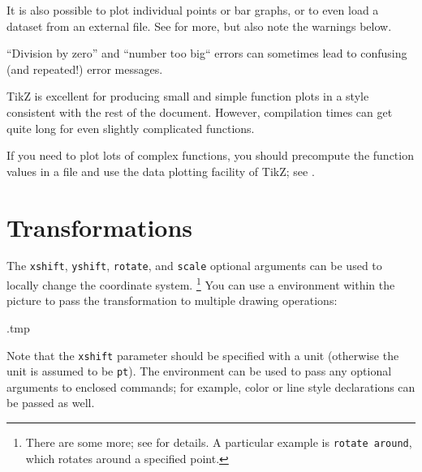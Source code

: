 It is also possible to plot individual points or bar graphs,
or to even load a dataset from an external file.
See \cite[Section~22]{tikz} for more,
but also note the warnings below.

\begin{warning}
``Division by zero'' and ``number too big`` errors
can sometimes lead to confusing (and repeated!) error messages.
\end{warning}

\begin{practices}
TikZ is excellent for producing small and simple function plots
in a style consistent with the rest of the document.
However, compilation times can get quite long for even slightly complicated functions.

If you need to plot lots of complex functions,
you should precompute the function values in a file
and use the data plotting facility of TikZ; see \cite[Section~22]{tikz}.
\end{practices}



%
%
\section{Transformations}

The \verb|xshift|, \verb|yshift|, \verb|rotate|, and \verb|scale| optional arguments
can be used to locally change the coordinate system.%
\footnote{There are some more; see \cite[Section~25.3]{tikz} for details.
A particular example is \texttt{rotate around}, which rotates around a specified point.}
You can use a  environment within the picture
to pass the transformation to multiple drawing operations:
%
\begin{VerbatimOut}{\jobname.tmp}
\centering
{}
\end{VerbatimOut}
\ShowExampleBelow[2]
%
Note that the \verb|xshift| parameter should be specified with a unit
(otherwise the unit is assumed to be \verb|pt|).
The  environment can be used to pass any optional arguments to enclosed commands;
for example, color or line style declarations can be passed as well.

